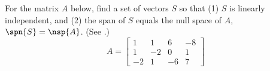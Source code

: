 For the matrix $A$ below, find a set of vectors $S$ so that (1) $S$ is linearly independent, and (2) the span of $S$ equals the null space of $A$, $\spn{S}=\nsp{A}$.  (See .)
%
\begin{equation*}
A=
\begin{bmatrix}
1 & 1 & 6 & -8\\
1 & -2 & 0 & 1\\
-2 & 1 & -6 & 7
\end{bmatrix}
\end{equation*}
%
